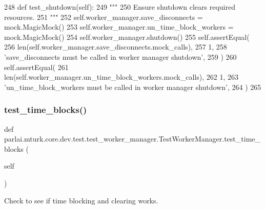 \begin{DoxyCode}
248     \textcolor{keyword}{def }test\_shutdown(self):
249         \textcolor{stringliteral}{"""}
250 \textcolor{stringliteral}{        Ensure shutdown clears required resources.}
251 \textcolor{stringliteral}{        """}
252         self.worker\_manager.save\_disconnects = mock.MagicMock()
253         self.worker\_manager.un\_time\_block\_workers = mock.MagicMock()
254         self.worker\_manager.shutdown()
255         self.assertEqual(
256             len(self.worker\_manager.save\_disconnects.mock\_calls),
257             1,
258             \textcolor{stringliteral}{'save\_disconnects must be called in worker manager shutdown'},
259         )
260         self.assertEqual(
261             len(self.worker\_manager.un\_time\_block\_workers.mock\_calls),
262             1,
263             \textcolor{stringliteral}{'un\_time\_block\_workers must be called in worker manager shutdown'},
264         )
265 
\end{DoxyCode}
\mbox{\label{classparlai_1_1mturk_1_1core_1_1dev_1_1test_1_1test__worker__manager_1_1TestWorkerManager_a433805c31fbc04c931a73a1730f0fac4}} 
\subsubsection{\texorpdfstring{test\+\_\+time\+\_\+blocks()}{test\_time\_blocks()}}
{\footnotesize\ttfamily def parlai.\+mturk.\+core.\+dev.\+test.\+test\+\_\+worker\+\_\+manager.\+Test\+Worker\+Manager.\+test\+\_\+time\+\_\+blocks (\begin{DoxyParamCaption}\item[{}]{self }\end{DoxyParamCaption})}

\begin{DoxyVerb}Check to see if time blocking and clearing works.
\end{DoxyVerb}
 

